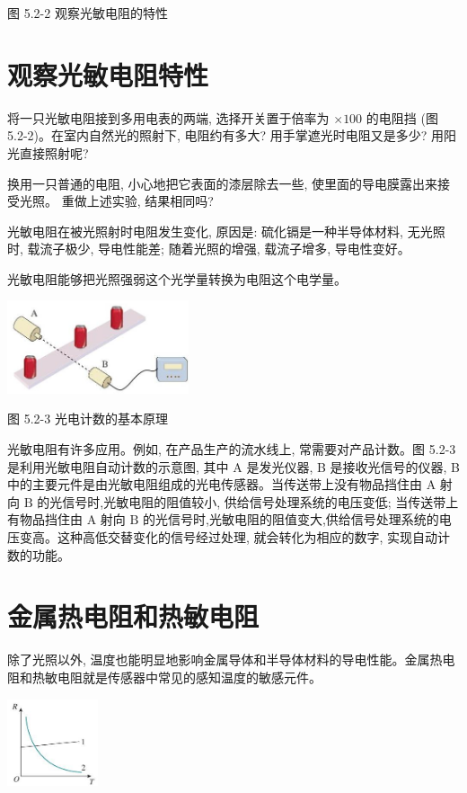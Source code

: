 \documentclass[10pt]{article}
\begin{document}
图 5.2-2 观察光敏电阻的特性

\section*{观察光敏电阻特性}

将一只光敏电阻接到多用电表的两端, 选择开关置于倍率为 \(\times {100}\) 的电阻挡 (图 5.2-2)。在室内自然光的照射下, 电阻约有多大? 用手掌遮光时电阻又是多少? 用阳光直接照射呢?

换用一只普通的电阻, 小心地把它表面的漆层除去一些, 使里面的导电膜露出来接受光照。 重做上述实验, 结果相同吗?

光敏电阻在被光照射时电阻发生变化, 原因是: 硫化镉是一种半导体材料, 无光照时, 载流子极少, 导电性能差; 随着光照的增强, 载流子增多, 导电性变好。

光敏电阻能够把光照强弱这个光学量转换为电阻这个电学量。

\begin{center}
\includegraphics[max width=0.4\textwidth]{images/01910e72-c5b7-7ed5-a6d4-fb3a5faefc32_103_574268.jpg}
\end{center}

图 5.2-3 光电计数的基本原理

光敏电阻有许多应用。例如, 在产品生产的流水线上, 常需要对产品计数。图 5.2-3 是利用光敏电阻自动计数的示意图, 其中 A 是发光仪器, B 是接收光信号的仪器, B 中的主要元件是由光敏电阻组成的光电传感器。当传送带上没有物品挡住由 \(\mathrm{A}\) 射向 \(\mathrm{B}\) 的光信号时,光敏电阻的阻值较小, 供给信号处理系统的电压变低; 当传送带上有物品挡住由 \(\mathrm{A}\) 射向 \(\mathrm{B}\) 的光信号时,光敏电阻的阻值变大,供给信号处理系统的电压变高。这种高低交替变化的信号经过处理, 就会转化为相应的数字, 实现自动计数的功能。

\section*{金属热电阻和热敏电阻}

除了光照以外, 温度也能明显地影响金属导体和半导体材料的导电性能。金属热电阻和热敏电阻就是传感器中常见的感知温度的敏感元件。

\begin{center}
\includegraphics[max width=0.2\textwidth]{images/01910e72-c5b7-7ed5-a6d4-fb3a5faefc32_103_382701.jpg}
\end{center}
\end{document}
